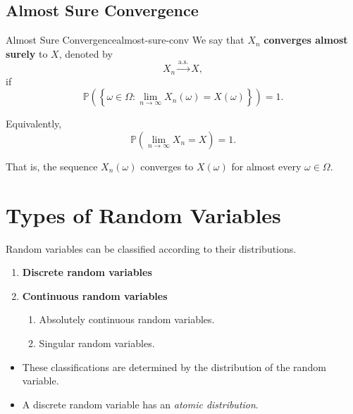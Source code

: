 \subsection{Almost Sure Convergence}

\begin{definition}{Almost Sure Convergence}{almost-sure-conv}
We say that $X_n$ \textbf{converges almost surely} to $X$, denoted by
\[
    X_n \xrightarrow{\mathrm{a.s.}} X,
\]
if
\[
    \mathbb{P}\left(
        \left\{
        \omega\in\Omega:
        \lim_{n\to\infty}X_n(\omega)=X(\omega)
        \right\}
    \right)
    =1.
\]

Equivalently,
\[
    \mathbb{P}\left(
        \lim_{n\to\infty}X_n=X
    \right)
    =1.
\]

That is, the sequence $X_n(\omega)$ converges to $X(\omega)$
for almost every $\omega\in\Omega$.
\end{definition}
\section{Types of Random Variables}

Random variables can be classified according to their distributions.

\begin{enumerate}

    \item \textbf{Discrete random variables}

    \item \textbf{Continuous random variables}

    \begin{enumerate}

        \item Absolutely continuous random variables.

        \item Singular random variables.

    \end{enumerate}

\end{enumerate}

\begin{itemize}
    \item These classifications are determined by the distribution of the
random variable.

\item A discrete random variable has an \emph{atomic distribution}.
\end{itemize}

